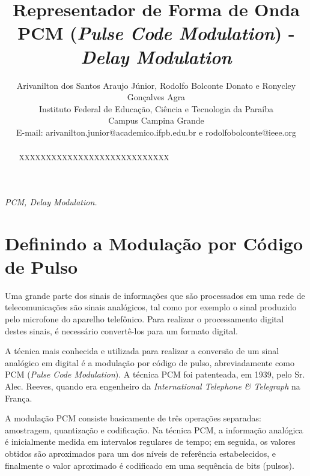 \documentclass[journal]{IEEEtran}
\begin{document}
\onehalfspacing

\title{Representador de Forma de Onda PCM (\textit{Pulse Code Modulation}) - \textit{Delay Modulation}}
\author{Arivanilton dos Santos Araujo Júnior, Rodolfo Bolconte Donato e Ronycley Gonçalves Agra\\

Instituto Federal de Educação, Ciência e Tecnologia da Paraíba\\Campus Campina Grande\\
E-mail: arivanilton.junior@academico.ifpb.edu.br e rodolfobolconte@ieee.org
}


\maketitle


\begin{abstract}
XXXXXXXXXXXXXXXXXXXXXXXXXXXX
\end{abstract}

\begin{IEEEkeywords}
\textit{PCM, Delay Modulation.}
\end{IEEEkeywords}



\section{Definindo a Modulação por Código de Pulso}

Uma grande parte dos sinais de informações que são processados em uma rede de telecomunicações são sinais analógicos, tal como por exemplo o sinal produzido pelo microfone do aparelho telefônico. Para realizar o processamento digital destes sinais, é necessário convertê-los para um formato digital.

A técnica mais conhecida e utilizada para realizar a conversão de um sinal analógico em digital é a modulação por código de pulso, abreviadamente como PCM (\textit{Pulse Code Modulation}). A técnica PCM foi patenteada, em 1939, pelo Sr. Alec. Reeves, quando era engenheiro da \textit{International Telephone \& Telegraph} na França.

A modulação PCM consiste basicamente de três operações separadas: amostragem, quantização e codificação. Na técnica PCM, a informação analógica é inicialmente medida em intervalos regulares de tempo; em seguida, os valores obtidos são aproximados para um dos níveis de referência estabelecidos, e finalmente o valor aproximado é codificado em uma sequência de bits (pulsos).
\end{document}
